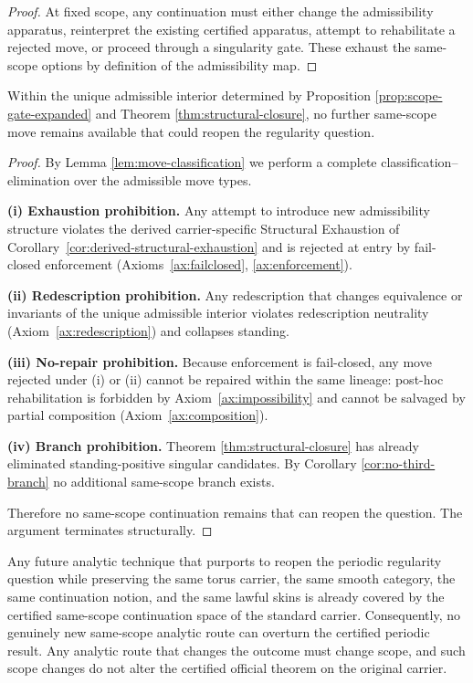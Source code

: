 \begin{proof}
At fixed scope, any continuation must either change the admissibility apparatus, reinterpret the
existing certified apparatus, attempt to rehabilitate a rejected move, or proceed through a
singularity gate. These exhaust the same-scope options by definition of the admissibility map.
\end{proof}

\begin{theorem}[Terminality]\label{thm:terminality}
Within the unique admissible interior determined by Proposition \ref{prop:scope-gate-expanded} and Theorem
\ref{thm:structural-closure}, no further same-scope move remains available that could reopen the
regularity question.
\end{theorem}

\begin{proof}
By Lemma \ref{lem:move-classification} we perform a complete classification–elimination over the admissible move types.

\textbf{(i) Exhaustion prohibition.} Any attempt to introduce new admissibility structure violates the
derived carrier-specific Structural Exhaustion of Corollary~\ref{cor:derived-structural-exhaustion}
and is rejected at entry by fail-closed enforcement
(Axioms~\ref{ax:failclosed}, \ref{ax:enforcement}).

\textbf{(ii) Redescription prohibition.} Any redescription that changes equivalence or invariants of
the unique admissible interior violates redescription neutrality (Axiom~\ref{ax:redescription}) and collapses standing.

\textbf{(iii) No-repair prohibition.} Because enforcement is fail-closed, any move rejected under
(i) or (ii) cannot be repaired within the same lineage: post-hoc rehabilitation is forbidden by
Axiom~\ref{ax:impossibility} and cannot be salvaged by partial composition (Axiom~\ref{ax:composition}).

\textbf{(iv) Branch prohibition.} Theorem \ref{thm:structural-closure} has already eliminated
standing-positive singular candidates. By Corollary \ref{cor:no-third-branch} no additional same-scope
branch exists.

Therefore no same-scope continuation remains that can reopen the question. The argument terminates
structurally.
\end{proof}

\begin{corollary}\label{cor:no-same-scope-analytic-escape}
Any future analytic technique that purports to reopen the periodic regularity question while preserving
the same torus carrier, the same smooth category, the same continuation notion, and the same lawful
skins is already covered by the certified same-scope continuation space of the standard carrier.
Consequently, no genuinely new same-scope analytic route can overturn the certified periodic result.
Any analytic route that changes the outcome must change scope, and such scope changes do not alter
the certified official theorem on the original carrier.
\end{corollary}

